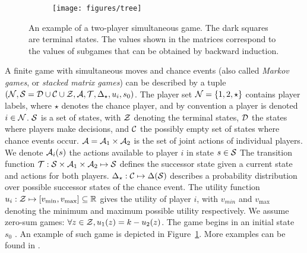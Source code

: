 
\begin{figure}[t!]
\centering
\begin{subfigure}{12cm}
\centering
\texttt{[image: figures/tree]}\\
\end{subfigure}%
\caption{An example of a two-player simultaneous game. %
The dark squares are terminal states. The values shown in the matrices correspond to the values of subgames that can be obtained by backward induction.\\
\label{fig:example}}
\end{figure}

A finite game with simultaneous moves and chance events (also called \emph{Markov games}, or \emph{stacked matrix games}) can be described
by a tuple $(\mathcal{N}, \mathcal{S} = \mathcal{D}\cup\mathcal{C}\cup\mathcal{Z}, \mathcal{A}, \mathcal{T}, \Delta_\star, u_i, s_0)$.
The player set $\mathcal{N} = \{ 1, 2, \star \}$ contains player labels, where
$\star$ denotes the chance player, and by convention a player is denoted $i \in \mathcal{N}$.
$\mathcal{S}$ is a set of states, with $\mathcal{Z}$ denoting the terminal states, $\mathcal{D}$ the states where players make decisions,
and $\mathcal{C}$ the possibly empty set of states where chance events occur. $\mathcal{A} = \mathcal{A}_1 \times \mathcal{A}_2$ is the set of
joint actions of individual players. We denote $\mathcal{A}_i(s)$ the actions available to player $i$ in state $s \in \mathcal{S}$ 
The transition function $\mathcal{T} : \mathcal{S} \times \mathcal{A}_1 \times \mathcal{A}_2 \mapsto \mathcal{S}$ defines the successor state given a current
state and actions for both players. $\Delta_\star:\mathcal{C} \mapsto \Delta(\mathcal{S})$ describes a probability distribution over
possible successor states of the chance event.
The utility function $u_i : \mathcal{Z} \mapsto [v_{\min}, v_{\max}] \subseteq \mathbb{R}$ gives the utility of player $i$, with
$v_{min}$ and $v_{\max}$ denoting the minimum and maximum possible utility respectively. We assume zero-sum
games: $\forall z \in \mathcal{Z}, u_1(z) = k - u_2(z)$.
The game begins in an initial state $s_0$ .
An example of such game is depicted in Figure~\ref{fig:example}. More examples can be found in \cite[Chapter 5]{Saffidine2013thesis}.

